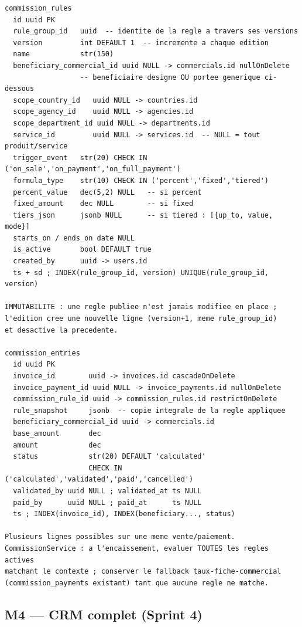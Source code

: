 \documentclass[11pt,a4paper]{article}
\begin{document}
\begin{lstlisting}
commission_rules
  id uuid PK
  rule_group_id   uuid  -- identite de la regle a travers ses versions
  version         int DEFAULT 1  -- incremente a chaque edition
  name            str(150)
  beneficiary_commercial_id uuid NULL -> commercials.id nullOnDelete
                  -- beneficiaire designe OU portee generique ci-dessous
  scope_country_id   uuid NULL -> countries.id
  scope_agency_id    uuid NULL -> agencies.id
  scope_department_id uuid NULL -> departments.id
  service_id         uuid NULL -> services.id  -- NULL = tout produit/service
  trigger_event   str(20) CHECK IN ('on_sale','on_payment','on_full_payment')
  formula_type    str(10) CHECK IN ('percent','fixed','tiered')
  percent_value   dec(5,2) NULL   -- si percent
  fixed_amount    dec NULL        -- si fixed
  tiers_json      jsonb NULL      -- si tiered : [{up_to, value, mode}]
  starts_on / ends_on date NULL
  is_active       bool DEFAULT true
  created_by      uuid -> users.id
  ts + sd ; INDEX(rule_group_id, version) UNIQUE(rule_group_id, version)

IMMUTABILITE : une regle publiee n'est jamais modifiee en place ;
l'edition cree une nouvelle ligne (version+1, meme rule_group_id)
et desactive la precedente.

commission_entries
  id uuid PK
  invoice_id        uuid -> invoices.id cascadeOnDelete
  invoice_payment_id uuid NULL -> invoice_payments.id nullOnDelete
  commission_rule_id uuid -> commission_rules.id restrictOnDelete
  rule_snapshot     jsonb  -- copie integrale de la regle appliquee
  beneficiary_commercial_id uuid -> commercials.id
  base_amount       dec
  amount            dec
  status            str(20) DEFAULT 'calculated'
                    CHECK IN ('calculated','validated','paid','cancelled')
  validated_by uuid NULL ; validated_at ts NULL
  paid_by      uuid NULL ; paid_at      ts NULL
  ts ; INDEX(invoice_id), INDEX(beneficiary..., status)

Plusieurs lignes possibles sur une meme vente/paiement.
CommissionService : a l'encaissement, evaluer TOUTES les regles actives
matchant le contexte ; conserver le fallback taux-fiche-commercial
(commission_payments existant) tant que aucune regle ne matche.
\end{lstlisting}

\subsection{M4 --- CRM complet (Sprint 4)}
\end{document}
